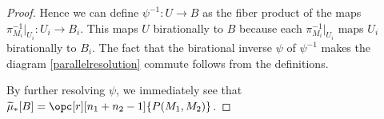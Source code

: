 \documentclass[12pt]{amsart}
\newcommand{\mb}{\mathbb}
\newcommand{\mc}{\mathcal}
\newcommand{\wt}{\widetilde}
\theoremstyle{plain}
\theoremstyle{definition}
\theoremstyle{remark}
\begin{document}
\begin{proof}
Hence we can define $\psi^{-1}:U \to B$ as the fiber product of the maps $\pi_{M_i}^{-1}|_{U_i} : U_i \to B_i$. This maps $U$ birationally to $B$ because each $\pi_{M_i}^{-1}|_{U_i}$ maps $U_i$ birationally to $B_i$. The fact that the birational inverse $\psi$ of $\psi^{-1}$ makes the diagram \eqref{parallelresolution} commute follows from the definitions.


By further resolving $\psi$, we immediately see that $\wt \mu_*[B] = \opc[r][n_1+n_2-1]{P(M_1, M_2)}$.

\end{proof}
\end{document}
